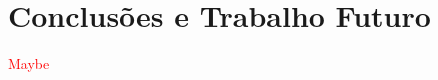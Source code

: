 \documentclass[a4paper,12pt]{scrreprt}
\begin{document}


\chapter{Conclusões e Trabalho Futuro}
    \textcolor{red}{
        Maybe
    }







\renewcommand{\nomname}{Lista de Siglas e Acrónimos}

\renewcommand{\nompreamble}{
    \textcolor{red}{
        <<Apresentar uma lista com todas as siglas e acrónimos utilizados durante a realização do trabalho. O formato base para esta lista deverá ser da forma como abaixo se apresenta.>>
    }
}
\end{document}
